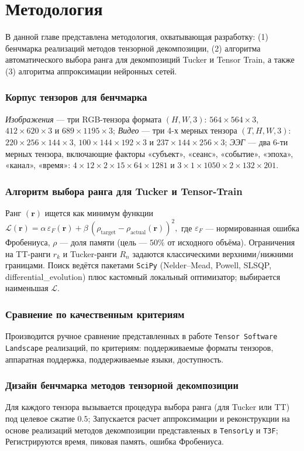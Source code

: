 \chapter{Методология}
\label{chap:methodology}

В данной главе представлена методология, охватывающая разработку: (1) бенчмарка реализаций методов тензорной декомпозиции, (2) алгоритма автоматического выбора ранга для декомпозиций Tucker и Tensor Train, а также (3) алгоритма аппроксимации нейронных сетей.

\subsection*{Корпус тензоров для бенчмарка}
\emph{Изображения} — три RGB-тензора формата \((H,W,3)\): $564\times564\times3$, $412\times620\times3$ и $689\times1195\times3$; \emph{Видео} — три 4-х мерных тензора \((T,H,W,3)\): $220\times256\times144\times3$, $100\times144\times192\times3$ и $237\times144\times256\times3$; \emph{ЭЭГ} — два 6-ти мерных тензора, включающие факторы «субъект», «сеанс», «событие», «эпоха», «канал», «время»: $4\times12\times2\times15\times64\times1281$ и $3\times1\times1050\times2\times132\times201$.

\subsection*{Алгоритм выбора ранга для Tucker и Tensor-Train}
Ранг $(\mathbf r)$ ищется как минимум функции
$\mathcal{L}(\mathbf r)=
\alpha\,\varepsilon_F(\mathbf r)+
\beta\,(\rho_{\text{target}}-\rho_{\text{actual}}(\mathbf r))^{2},$
где $\varepsilon_F$ — нормированная ошибка Фробениуса,  
$\rho$ — доля памяти (цель — $50\%$ от исходного объёма).  
Ограничения на TT-ранги $r_k$ и Tucker-ранги $R_n$ задаются классическими верхними/нижними границами.  
Поиск ведётся пакетами \texttt{SciPy} (Nelder–Mead, Powell, SLSQP, differential\_evolution) плюс кастомный локальный оптимизатор; выбирается наименьшая $\mathcal{L}$.

\subsection*{Сравнение по качественным критериям}
Производится ручное сравнение представленных в работе \texttt{Tensor Software Landscape} реализаций, по критериям: поддерживаемые форматы тензоров, аппаратная поддержка, поддерживаемые языки, доступность.

\subsection*{Дизайн бенчмарка методов тензорной декомпозиции}
Для каждого тензора вызывается процедура выбора ранга (для Tucker или TT) под целевое сжатие $0.5$; Запускается расчет аппроксимации и реконструкции на основе реализаций методов декомпозиции представленых в \texttt{TensorLy} и \texttt{T3F}; Регистрируются время, пиковая память, ошибка Фробениуса.

